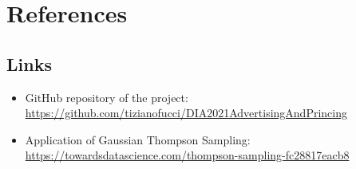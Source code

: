 \documentclass[12pt,a4paper]{report}
\begin{document}
	\chapter{References}
		\section{Links}

\begin{itemize}
	\item GitHub repository of the project: \url{https://github.com/tizianofucci/DIA2021AdvertisingAndPrincing}
	\item Application of Gaussian Thompson Sampling: \url{https://towardsdatascience.com/thompson-sampling-fc28817eacb8}
\end{itemize}
\end{document}
